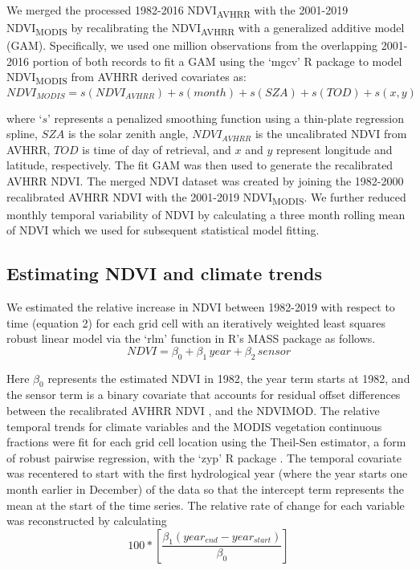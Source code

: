 \documentclass[gc, manuscript]{copernicus}
\begin{document}
We merged the processed 1982-2016 NDVI\textsubscript{AVHRR} with the
2001-2019 NDVI\textsubscript{MODIS} by recalibrating the
NDVI\textsubscript{AVHRR} with a generalized additive model (GAM).
Specifically, we used one million observations from the overlapping
2001-2016 portion of both records to fit a GAM using the `mgcv' R
package \citep{woodGeneralizedAdditiveModels2017b} to model
NDVI\textsubscript{MODIS} from AVHRR derived covariates as:
\begin{equation}
NDVI_{MODIS} = s(NDVI_{AVHRR})+s(month) + s(SZA) + s(TOD) + s(x,y)
\end{equation}

where `\(s\)' represents a penalized smoothing function using a
thin-plate regression spline, \(SZA\) is the solar zenith angle,
\(NDVI_{AVHRR}\) is the uncalibrated NDVI from AVHRR, \(TOD\) is time of
day of retrieval, and \(x\) and \(y\) represent longitude and latitude,
respectively. The fit GAM was then used to generate the recalibrated
AVHRR NDVI. The merged NDVI dataset was created by joining the 1982-2000
recalibrated AVHRR NDVI with the 2001-2019 NDVI\textsubscript{MODIS}. We
further reduced monthly temporal variability of NDVI by calculating a
three month rolling mean of NDVI which we used for subsequent
statistical model fitting.

\subsection{Estimating NDVI and climate trends}

We estimated the relative increase in NDVI between 1982-2019 with
respect to time (equation 2) for each grid cell with an iteratively
weighted least squares robust linear model via the `rlm' function in R's
MASS package \citep{venablesModernAppliedStatistics2002} as follows.
\begin{equation}
NDVI=\beta_0+ \beta_1\,year+\beta_2\,sensor
\end{equation}

Here \(\beta_0\) represents the estimated NDVI in 1982, the year term
starts at 1982, and the sensor term is a binary covariate that accounts
for residual offset differences between the recalibrated AVHRR NDVI ,
and the NDVIMOD. The relative temporal trends for climate variables and
the MODIS vegetation continuous fractions were fit for each grid cell
location using the Theil-Sen estimator, a form of robust pairwise
regression, with the `zyp' R package
\citep{bronaughZypZhangYuePilon2019}. The temporal covariate was
recentered to start with the first hydrological year (where the year
starts one month earlier in December) of the data so that the intercept
term represents the mean at the start of the time series. The relative
rate of change for each variable was reconstructed by calculating
\begin{equation}
100*[\frac{\beta_1(year_{end}-year_{start})}{\beta_0}]
\end{equation}
\end{document}
